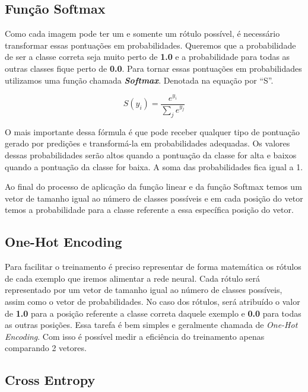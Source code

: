 \subsection{Função Softmax}

Como cada imagem pode ter um e somente um rótulo possível, é necessário
transformar essas pontuações em probabilidades. Queremos que a
probabilidade de ser a classe correta seja muito perto de {\bf 1.0} e
a probabilidade para todas as outras classes fique perto de {\bf
  0.0}.
Para tornar essas pontuações em probabilidades utilizamos uma função
chamada {\bf \emph{Softmax}}. Denotada na equação por ``S''.

\begin{equation}
   S(y_i) = \displaystyle\frac{e^{y_i}}{\displaystyle\sum_{j} e^{y_j}}
\end{equation}

O mais importante dessa fórmula é que pode receber qualquer tipo de
pontuação gerado por predições e transformá-la em probabilidades
adequadas. Os valores dessas probabilidades serão altos quando a
pontuação da classe for alta e baixos quando a pontuação da classe for
baixa. A soma das probabilidades fica igual a 1.

Ao final do processo de aplicação da função linear e da função
Softmax temos um vetor de tamanho igual ao número de classes possíveis
e em cada posição do vetor temos a probabilidade para a classe
referente a essa específica posição do vetor.

\subsection{One-Hot Encoding}

Para facilitar o treinamento é preciso representar de forma matemática
os rótulos de cada exemplo que iremos alimentar a rede neural. Cada
rótulo será representado por um vetor de tamanho igual ao número de
classes possíveis, assim como o vetor de probabilidades. No caso dos
rótulos, será atribuído o valor de {\bf 1.0} para a posição referente
a classe correta daquele exemplo e {\bf 0.0} para todas as outras
posições. Essa tarefa é bem simples e geralmente chamada de
\textit{One-Hot Encoding}. Com isso é possível medir a eficiência do
treinamento apenas comparando 2 vetores.

\subsection{Cross Entropy}


